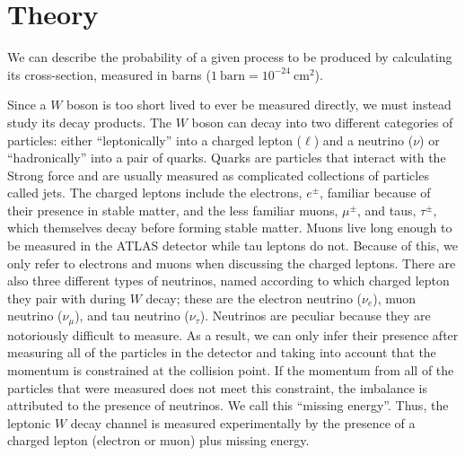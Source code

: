 \chapter{Theory}
\label{sec:theory}






We can describe the probability of a given process to be produced by calculating its cross-section, measured in barns ($1~\textrm{barn}=10^{-24}~\textrm{cm}^2$).


Since a $W$ boson is too short lived to ever be measured directly, we
must instead study its decay products. 
The $W$ boson can decay into two different categories of 
particles: either
``leptonically'' into a charged lepton ($\ell$) and a 
neutrino ($\nu$) or ``hadronically''
into a pair of quarks.
Quarks are particles that interact with the Strong force and are 
usually measured as complicated
collections of particles called jets.
The charged leptons include the 
electrons, $e^{\pm}$, familiar because of their presence in stable matter,
and the less familiar muons, $\mu^{\pm}$, and taus, $\tau^{\pm}$, 
which themselves decay before forming stable matter.  
Muons live long enough to be measured
in the ATLAS detector while tau leptons do not. Because of this, we 
only refer to electrons and muons when discussing the charged leptons.
There are also three different types of neutrinos, named according to which
charged lepton they pair with 
during $W$ decay;  these are the electron neutrino ($\nu_e$),
muon neutrino ($\nu_{\mu}$), and tau neutrino ($\nu_{\tau}$). 
Neutrinos are peculiar 
because they are notoriously difficult to measure.  
As a result, we can only infer their presence after measuring all 
of the particles in the detector and taking into account
that the momentum is constrained at the collision point. If the momentum 
from all of the particles that were measured does not meet this 
constraint, the imbalance is attributed to the
presence of neutrinos. We call this ``missing energy''.  Thus, the 
leptonic $W$  decay channel is measured
experimentally by the presence of a charged lepton 
(electron or muon) plus missing energy.




